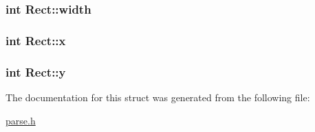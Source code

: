 \subsubsection[{width}]{\setlength{\rightskip}{0pt plus 5cm}int Rect\+::width}\label{structRect_a367714e71d566668addb140c7981b5bc}
\hypertarget{structRect_a64d1ef14e429e1816539de4c54361e55}{}
\subsubsection[{x}]{\setlength{\rightskip}{0pt plus 5cm}int Rect\+::x}\label{structRect_a64d1ef14e429e1816539de4c54361e55}
\hypertarget{structRect_a1e37b6f8a4fb0d68ba22c8fffffab0a4}{}
\subsubsection[{y}]{\setlength{\rightskip}{0pt plus 5cm}int Rect\+::y}\label{structRect_a1e37b6f8a4fb0d68ba22c8fffffab0a4}


The documentation for this struct was generated from the following file\+:\begin{DoxyCompactItemize}
\item 
\hyperlink{parse_8h}{parse.\+h}\end{DoxyCompactItemize}
